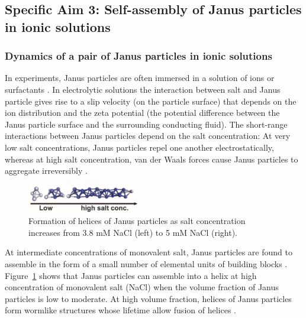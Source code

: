 \subsection{Specific Aim 3: Self-assembly of Janus particles in ionic solutions}
\label{subsec:specific_aim_3}

\subsubsection{Dynamics of a pair of Janus particles in ionic solutions\label{subsubsec:JP_electrolyte}}
In experiments, Janus particles are often immersed in a solution of ions \cite{Chen2011_Science} or surfactants \cite{Goodwin2009}.
In electrolytic solutions the interaction between salt and Janus particle gives 
rise to a slip velocity (on the particle surface) that depends on the ion distribution and the zeta potential \cite{BayatiNajafi2016_JCP} 
(the potential difference between the Janus particle surface and the surrounding conducting fluid).
The short-range interactions between Janus particles depend on the salt concentration:
At very low salt concentrations, Janus particles repel one another electrostatically, whereas at high salt concentration, van der Waals
forces cause Janus particles to aggregate irreversibly \cite{Goodwin2009}. 
%
\begin{figure}
  \vspace{-5pt}
\centerline{\includegraphics[width=0.44\textwidth]{Figures/fig2A_Chen2011_Science}}
  \vspace{-5pt}
\caption{\label{fig:helices_of_JPs} \footnotesize Formation of helices of Janus particles as salt concentration increases from 3.8 mM NaCl  (left) to 5 mM NaCl (right)\cite{Chen2011_Science}.}
\end{figure}
%
At intermediate concentrations of monovalent salt, Janus particles are found to assemble in the form of a small number of elemental units of building blocks \cite{Chen2011_Science}. 
Figure~\ref{fig:helices_of_JPs} shows that Janus particles can assemble into a helix at high concentration of monovalent salt (NaCl) when the volume fraction of Janus particles is low to moderate. At high volume fraction, helices of Janus particles form wormlike structures whose lifetime allow fusion of helices \cite{Chen2011_Science}. 

